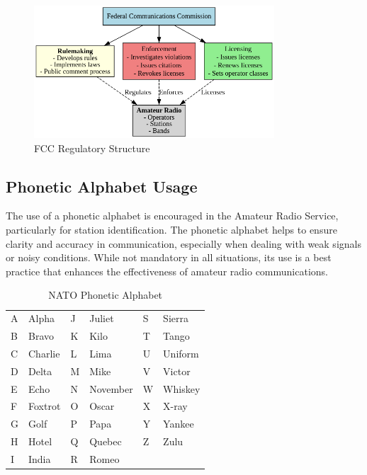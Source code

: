 \begin{figure}[ht]
    \centering
    \includegraphics[width=0.8\textwidth]{tech/organized/chapter_1/images/fcc_structure.png}
    \caption{FCC Regulatory Structure}
    \label{fig:fcc_structure}
\end{figure}


\subsection*{Phonetic Alphabet Usage}
The use of a phonetic alphabet is encouraged in the Amateur Radio Service, particularly for station identification. The phonetic alphabet helps to ensure clarity and accuracy in communication, especially when dealing with weak signals or noisy conditions. While not mandatory in all situations, its use is a best practice that enhances the effectiveness of amateur radio communications.

\begin{table}[ht]
    \centering
    \begin{tabular}{|l|l||l|l||l|l|}
        \hline
        A & Alpha & J & Juliet & S & Sierra \\
        B & Bravo & K & Kilo & T & Tango \\
        C & Charlie & L & Lima & U & Uniform \\
        D & Delta & M & Mike & V & Victor \\
        E & Echo & N & November & W & Whiskey \\
        F & Foxtrot & O & Oscar & X & X-ray \\
        G & Golf & P & Papa & Y & Yankee \\
        H & Hotel & Q & Quebec & Z & Zulu \\
        I & India & R & Romeo & & \\
        \hline
    \end{tabular}
    \caption{NATO Phonetic Alphabet}
    \label{tab:phonetic_alphabet}
\end{table}

